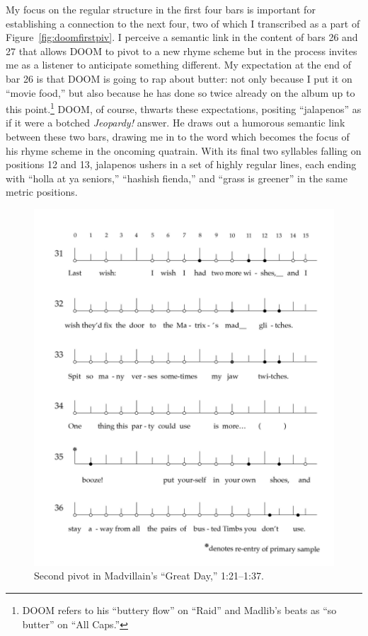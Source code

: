 My focus on the regular structure in the first four bars is important for establishing a connection
to the next four, two of which I transcribed as a part of Figure~\ref{fig:doomfirstpiv}. I perceive 
a semantic link in the content of bars 26 and 27 that allows DOOM to pivot to a new rhyme scheme but
in the process invites me as a listener to anticipate something different. My expectation at the end 
of  bar 26 is that DOOM is going to rap about butter: not only because I put it on ``movie food,'' 
but also because he has done so twice already on the album up to this point.\footnote{
    DOOM refers to his ``buttery flow'' on ``Raid'' and Madlib's beats as ``so butter'' on ``All 
    Caps.''}
DOOM, of course, thwarts these expectations, positing ``jalapenos'' as if it were a botched 
\textit{Jeopardy!} answer. He draws out a humorous semantic link between these two bars, drawing
me in to the word which becomes the focus of his rhyme scheme in the oncoming quatrain. With its
final two syllables falling on positions 12 and 13, jalapenos ushers in a set of highly regular
lines, each ending with ``holla at ya seniors,'' ``hashish fienda,'' and ``grass is greener''
in the same metric positions.

    \begin{figure}[!p]
        \centering
        \includegraphics{images/figures/chp 03/121137greatdaysecondpivot.pdf}
        \caption{Second pivot in Madvillain's ``Great Day,'' 1:21--1:37.}
        \label{fig:doomsecondpiv}
    \end{figure}

